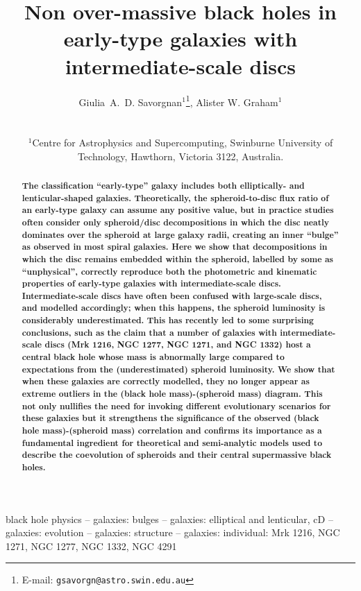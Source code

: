 \documentclass[useAMS,usenatbib,article]{mnras}
\title[Non over-massive black holes in early-type galaxies]{Non over-massive black holes in early-type galaxies with intermediate-scale discs}
\author[G.~A.~D. Savorgnan \& A.~W. Graham]
{\parbox{\textwidth}{
Giulia~A.~D. Savorgnan$^{1}$\thanks{E-mail: \texttt{gsavorgn@astro.swin.edu.au}},
Alister W. Graham$^{1}$}\vspace{0.4cm}\\
\parbox{\textwidth}{
$^{1}$Centre for Astrophysics and Supercomputing, Swinburne University of Technology, Hawthorn, Victoria 3122, Australia.\\}}
\begin{document}
\maketitle

\label{firstpage}



\begin{abstract}
{\bf The classification ``early-type'' galaxy includes both elliptically- and lenticular-shaped galaxies. 
Theoretically, the spheroid-to-disc flux ratio of an early-type galaxy can assume any positive value,  
but in practice studies often consider only spheroid/disc decompositions 
in which the disc neatly dominates over the spheroid at large galaxy radii, 
creating an inner ``bulge'' as observed in most spiral galaxies. 
Here we show that decompositions in which the disc remains embedded within the spheroid, 
labelled by some as ``unphysical'',  
correctly reproduce both the photometric and kinematic properties of early-type galaxies 
with intermediate-scale discs. 
Intermediate-scale discs have often been confused with large-scale discs, and modelled accordingly; 
when this happens, the spheroid luminosity is considerably underestimated. 
This has recently led to some surprising conclusions, 
such as the claim that a number of galaxies with intermediate-scale discs (Mrk 1216, NGC 1277, NGC 1271, and NGC 1332) 
host a central black hole whose mass is abnormally large compared to expectations from the (underestimated) spheroid luminosity. 
We show that when these galaxies are correctly modelled, 
they no longer appear as extreme outliers in the (black hole mass)-(spheroid mass) diagram. 
This not only nullifies the need for invoking different evolutionary scenarios for these galaxies 
but it strengthens the significance of the observed (black hole mass)-(spheroid mass) correlation 
and confirms its importance as a fundamental ingredient for theoretical and semi-analytic models 
used to describe the coevolution of spheroids and their central supermassive black holes. }

\end{abstract}

\begin{keywords}
black hole physics -- galaxies: bulges -- galaxies: elliptical and lenticular, cD -- 
galaxies: evolution -- galaxies: structure -- galaxies: individual: Mrk 1216, NGC 1271, NGC 1277, NGC 1332, NGC 4291
\end{keywords}
\end{document}

